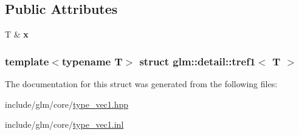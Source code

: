 \subsection*{\-Public \-Attributes}
\begin{DoxyCompactItemize}
\item 
\hypertarget{structglm_1_1detail_1_1tref1_a622e46b4e2d963116983cfc13b8c84ed}{\-T \& {\bfseries x}}\label{structglm_1_1detail_1_1tref1_a622e46b4e2d963116983cfc13b8c84ed}

\end{DoxyCompactItemize}
\subsubsection*{template$<$typename \-T$>$ struct glm\-::detail\-::tref1$<$ T $>$}



\-The documentation for this struct was generated from the following files\-:\begin{DoxyCompactItemize}
\item 
include/glm/core/\hyperlink{type__vec1_8hpp}{type\-\_\-vec1.\-hpp}\item 
include/glm/core/\hyperlink{type__vec1_8inl}{type\-\_\-vec1.\-inl}\end{DoxyCompactItemize}
